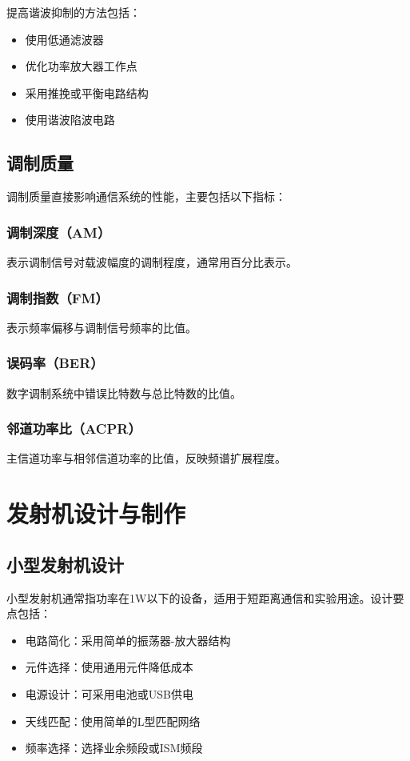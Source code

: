 \documentclass[12pt,UTF8]{ctexbook}
\begin{document}
提高谐波抑制的方法包括：
\begin{itemize}[leftmargin=3.5em]
    \item 使用低通滤波器
    \item 优化功率放大器工作点
    \item 采用推挽或平衡电路结构
    \item 使用谐波陷波电路
\end{itemize}

\subsection{调制质量}

调制质量直接影响通信系统的性能，主要包括以下指标：

\subsubsection{调制深度（AM）}
表示调制信号对载波幅度的调制程度，通常用百分比表示。

\subsubsection{调制指数（FM）}
表示频率偏移与调制信号频率的比值。

\subsubsection{误码率（BER）}
数字调制系统中错误比特数与总比特数的比值。

\subsubsection{邻道功率比（ACPR）}
主信道功率与相邻信道功率的比值，反映频谱扩展程度。

\section{发射机设计与制作}

\subsection{小型发射机设计}

小型发射机通常指功率在1W以下的设备，适用于短距离通信和实验用途。设计要点包括：

\begin{itemize}[leftmargin=3.5em]
    \item 电路简化：采用简单的振荡器-放大器结构
    \item 元件选择：使用通用元件降低成本
    \item 电源设计：可采用电池或USB供电
    \item 天线匹配：使用简单的L型匹配网络
    \item 频率选择：选择业余频段或ISM频段
\end{itemize}
\end{document}
